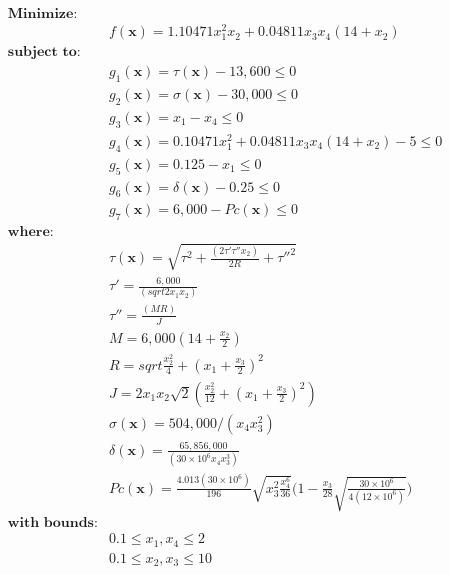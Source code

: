 \begin{align*}
\textbf{Minimize:} & \\
& f(\bm{x}) = 1.10471x_1^2x_2 + 0.04811x_3x_4(14 + x_2) \\[0.5em]
\textbf{subject to:} & \\
& g_1(\bm{x}) = \tau(\bm{x}) - 13,600 \leq 0 \\
& g_2(\bm{x}) = \sigma(\bm{x}) - 30,000 \leq 0 \\
& g_3(\bm{x}) = x_1 - x_4 \leq 0 \\
& g_4(\bm{x}) = 0.10471x_1^2 + 0.04811x_3x_4(14+x_2) - 5  \leq 0 \\
& g_5(\bm{x}) = 0.125 - x_1 \leq 0 \\
& g_6(\bm{x}) = \delta(\bm{x}) - 0.25 \leq 0 \\
& g_7(\bm{x}) = 6,000 - Pc(\bm{x}) \leq 0 \\[0.5em]
\textbf{where:} & \\
& \tau(\bm{x}) = \sqrt{\tau^2 + \frac{(2 \tau' \tau'' x_2)}{2R} + \tau''^2 } \\
& \tau' = \frac{6,000}{(sqrt{2} x_1 x_2)} \\[0.5em]
& \tau'' = \frac{(M R)}{J} \\
& M = 6,000 (14 + \frac{x_2}{2}) \\
& R = sqrt{\frac{x_2^2}{4} + (x_1 + \frac{x_3}{2})^2} \\
& J = 2 x_1 x_2 \sqrt{2} (\frac{x_2^2}{12} + (x_1 + \frac{x_3}{2})^2) \\[0.5em]
& \sigma(\bm{x}) = 504,000 / (x_4 x_3^2) \\
& \delta(\bm{x}) = \frac{65,856,000}{(30 \times 10^6 x_4 x_3^3)} \\
& Pc(\bm{x}) = \frac{4.013(30 \times 10^6)}{196} \sqrt{x_3^2 \frac{x_4^6}{36}} \Bigg(1 - \frac{x_3}{28} \sqrt{\frac{30 \times 10^6}{4(12 \times 10^6)}}\Bigg) \\[0.5em]
\textbf{with bounds:} & \\
&  0.1 \leq x_1, x_4 \leq 2 \\
&  0.1 \leq x_2, x_3 \leq 10
\end{align*}
